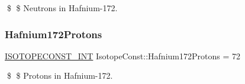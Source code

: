 \$ \$ Neutrons in Hafnium-\/172. \mbox{\label{group___isotope_const-_hafnium-_hf172_gac952e84055ada72a148bfb4f6c5d9d1c}} 
\subsubsection{\texorpdfstring{Hafnium172\+Protons}{Hafnium172Protons}}
{\footnotesize\ttfamily \mbox{\hyperlink{group___isotope_const-_macros_ga5f18360b3e99483a35c32d789e62621c}{I\+S\+O\+T\+O\+P\+E\+C\+O\+N\+S\+T\+\_\+\+I\+NT}} Isotope\+Const\+::\+Hafnium172\+Protons = 72}

\$ \$ Protons in Hafnium-\/172. 